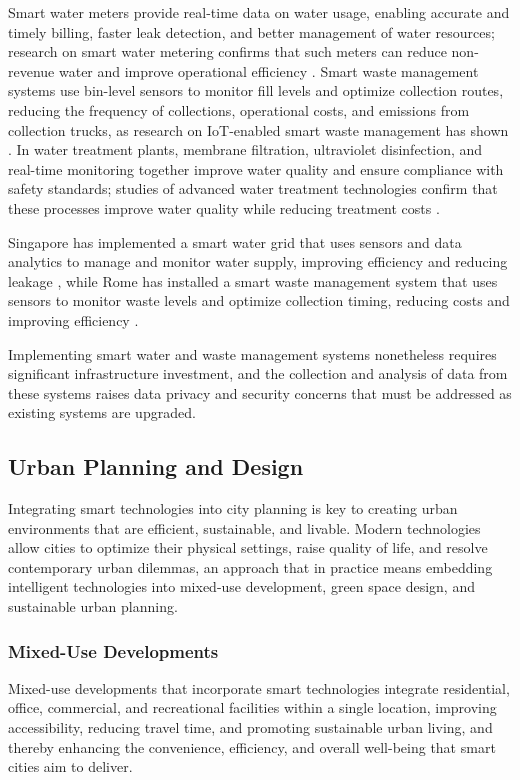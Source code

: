 \documentclass[journal]{IEEEtran}
\begin{document}
Smart water meters provide real-time data on water usage, enabling accurate and timely billing, faster leak detection, and better management of water resources; research on smart water metering confirms that such meters can reduce non-revenue water and improve operational efficiency \cite{r53}. Smart waste management systems use bin-level sensors to monitor fill levels and optimize collection routes, reducing the frequency of collections, operational costs, and emissions from collection trucks, as research on IoT-enabled smart waste management has shown \cite{r54}. In water treatment plants, membrane filtration, ultraviolet disinfection, and real-time monitoring together improve water quality and ensure compliance with safety standards; studies of advanced water treatment technologies confirm that these processes improve water quality while reducing treatment costs \cite{r55}.

Singapore has implemented a smart water grid that uses sensors and data analytics to manage and monitor water supply, improving efficiency and reducing leakage \cite{r56}, while Rome has installed a smart waste management system that uses sensors to monitor waste levels and optimize collection timing, reducing costs and improving efficiency \cite{r57}.

Implementing smart water and waste management systems nonetheless requires significant infrastructure investment, and the collection and analysis of data from these systems raises data privacy and security concerns that must be addressed as existing systems are upgraded.

\subsection{Urban Planning and Design}
Integrating smart technologies into city planning is key to creating urban environments that are efficient, sustainable, and livable. Modern technologies allow cities to optimize their physical settings, raise quality of life, and resolve contemporary urban dilemmas, an approach that in practice means embedding intelligent technologies into mixed-use development, green space design, and sustainable urban planning.

\subsubsection{Mixed-Use Developments}
Mixed-use developments that incorporate smart technologies integrate residential, office, commercial, and recreational facilities within a single location, improving accessibility, reducing travel time, and promoting sustainable urban living, and thereby enhancing the convenience, efficiency, and overall well-being that smart cities aim to deliver.
\end{document}
